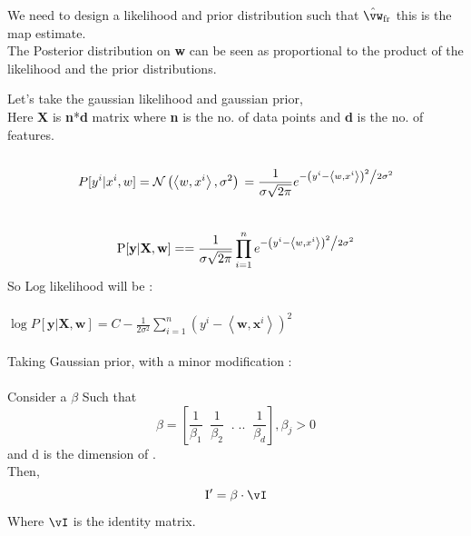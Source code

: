\documentclass[a4paper,11pt]{article}
\begin{document}
\begin{mlsolution}
We need to design a likelihood and prior distribution such that $\hat\vw_\text{fr}$ this is the map estimate.
\\The Posterior distribution on \textbf{w} can be seen as proportional to the product of the likelihood and the prior distributions.

Let's take the gaussian likelihood and gaussian prior,
\\Here \textbf
X
 is \textbf{n}*\textbf{d} matrix where \textbf{n} is the no. of data points and \textbf{d} is the no. of features.
\\\\
\[
P[y^{i}|x^{i}, w] = \mathcal{N} \left ( \left \langle w, x^{i} \right \rangle, \sigma^{2} \right ) 
\\
= \frac{1}{{\sigma \sqrt {2\pi } }}e^{{{ - \left( {y^{i} - \left \langle w, x^{i} \right \rangle } \right)^2 } \mathord{\left/ {\vphantom {{ - \left( {y^{i} - \left \langle w, x^{i} \right \rangle } \right)^2 } {2\sigma ^2 }}} \right. \kern-\nulldelimiterspace} {2\sigma ^2 }}}
\]\\

\[
\text{P}[\textbf{y} | \textbf{X}, \textbf{w}] = 
= \frac{1}{{\sigma \sqrt {2\pi } }} \prod_{i=1}^{n} e^{{{ - \left( {y^{i} - \left \langle w, x^{i} \right \rangle } \right)^2 } \mathord{\left/ {\vphantom {{ - \left( {y^{i} - \left \langle w, x^{i} \right \rangle } \right)^2 } {2\sigma ^2 }}} \right. \kern-\nulldelimiterspace} {2\sigma ^2 }}}

\]
So Log likelihood will be :
\\\\
\begin{math}
\log P[\textbf{y} | \textbf{X}, \textbf{w}] = C - \frac{1}{2\sigma^{2}} \sum_{i = 1}^{n} \left ( y^{i} - \left \langle \textbf{w}, \textbf{x}^{i} \right \rangle \right )^{2}
\end{math}
\\\\Taking Gaussian prior, with a minor modification :\\\\Consider a \begin{math} \beta \end{math} Such that \[ \beta = \left [ \frac{1}{\beta_{1}}\;\; \frac{1}{\beta_{2}}\;\; .\;..  \;\;\frac{1}{\beta_{d}} \right ] , \beta_{j} > 0\] and d is the dimension of \beta.\\Then, \[ \text{I}{}' = \beta\cdot\vI\] Where $\vI$ is the identity matrix.\\


\end{mlsolution}
\end{document}
